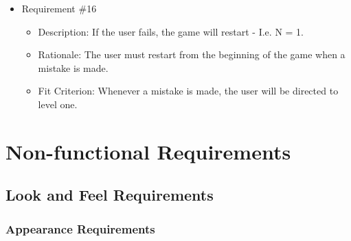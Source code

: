 \documentclass[12pt, titlepage]{article}
\begin{document}
\begin{itemize}
\item Requirement \#16
\begin{itemize}
\item Description: If the user fails, the game will restart - I.e. N = 1.
\item Rationale: The user must restart from the beginning of the game when a mistake is made.
\item Fit Criterion: Whenever a mistake is made, the user will be directed to level one.
\end{itemize}

\end{itemize}


\section{Non-functional Requirements}
\subsection{Look and Feel Requirements}
\subsubsection{Appearance Requirements}
\end{document}
